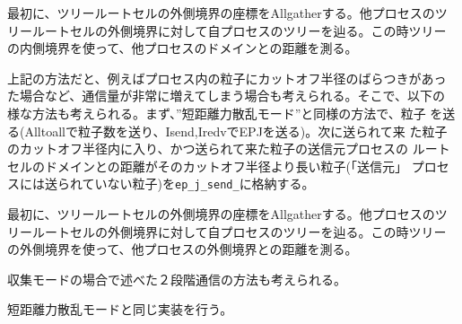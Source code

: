 最初に、ツリールートセルの外側境界の座標をAllgatherする。他プロセスのツ
リールートセルの外側境界に対して自プロセスのツリーを辿る。この時ツリー
の内側境界を使って、他プロセスのドメインとの距離を測る。

上記の方法だと、例えばプロセス内の粒子にカットオフ半径のばらつきがあっ
た場合など、通信量が非常に増えてしまう場合も考えられる。そこで、以下の
様な方法も考えられる。まず、”短距離力散乱モード”と同様の方法で、粒子
を送る(Alltoallで粒子数を送り、Isend,IredvでEPJを送る)。次に送られて来
た粒子のカットオフ半径内に入り、かつ送られて来た粒子の送信元プロセスの
ルートセルのドメインとの距離がそのカットオフ半径より長い粒子(「送信元」
プロセスには送られていない粒子)を{\tt ep\_j\_send\_}に格納する。






最初に、ツリールートセルの外側境界の座標をAllgatherする。他プロセスのツ
リールートセルの外側境界に対して自プロセスのツリーを辿る。この時ツリー
の外側境界を使って、他プロセスの外側境界との距離を測る。

収集モードの場合で述べた２段階通信の方法も考えられる。




短距離力散乱モードと同じ実装を行う。



